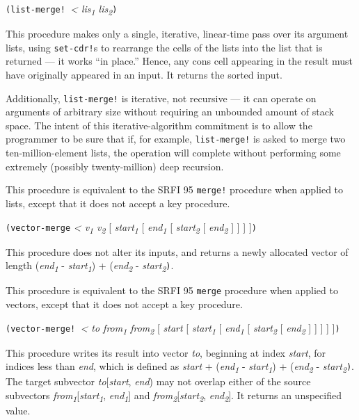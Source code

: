 \texttt{(list-merge!\ }\emph{\textless{} lis\textsubscript{1}
lis\textsubscript{2}}\texttt{)}

This procedure makes only a single, iterative, linear-time pass over its
argument lists, using \texttt{set-cdr!}s to rearrange the cells of the
lists into the list that is returned --- it works ``in place.'' Hence,
any cons cell appearing in the result must have originally appeared in
an input. It returns the sorted input.

Additionally, \texttt{list-merge!} is iterative, not recursive --- it
can operate on arguments of arbitrary size without requiring an
unbounded amount of stack space. The intent of this iterative-algorithm
commitment is to allow the programmer to be sure that if, for example,
\texttt{list-merge!} is asked to merge two ten-million-element lists,
the operation will complete without performing some extremely (possibly
twenty-million) deep recursion.

This procedure is equivalent to the SRFI 95 \texttt{merge!} procedure
when applied to lists, except that it does not accept a key procedure.

\texttt{(vector-merge} \emph{\textless{} v\textsubscript{1}
v\textsubscript{2}} {[} \emph{start\textsubscript{1}} {[}
\emph{end\textsubscript{1}} {[} \emph{start\textsubscript{2}} {[}
\emph{end\textsubscript{2}} {]} {]} {]} {]}\texttt{)}

This procedure does not alter its inputs, and returns a newly allocated
vector of length (\emph{end\textsubscript{1}} -
\emph{start\textsubscript{1}}) + (\emph{end\textsubscript{2}} -
\emph{start\textsubscript{2}}\texttt{)}.

This procedure is equivalent to the SRFI 95 \texttt{merge} procedure
when applied to vectors, except that it does not accept a key procedure.

\texttt{(vector-merge!\ }\emph{\textless{} to from\textsubscript{1}
from\textsubscript{2}} {[} \emph{start} {[}
\emph{start\textsubscript{1}} {[} \emph{end\textsubscript{1}} {[}
\emph{start\textsubscript{2}} {[} \emph{end\textsubscript{2}} {]} {]}
{]} {]} {]}\texttt{)}

This procedure writes its result into vector \emph{to}, beginning at
index \emph{start}, for indices less than \emph{end}, which is defined
as \emph{start} + (\emph{end\textsubscript{1}} -
\emph{start\textsubscript{1}}) + (\emph{end\textsubscript{2}} -
\emph{start\textsubscript{2}}\texttt{)}. The target subvector
\emph{to}{[}\emph{start}, \emph{end}) may not overlap either of the
source subvectors
\emph{from\textsubscript{1}}{[}\emph{start\textsubscript{1}},
\emph{end\textsubscript{1}}{]} and
\emph{from\textsubscript{2}}{[}\emph{start\textsubscript{2}},
\emph{end\textsubscript{2}}{]}. It returns an unspecified value.

